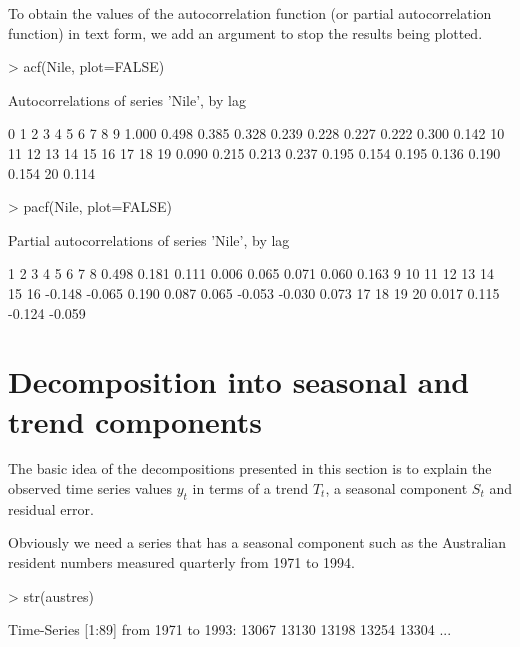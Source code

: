 To obtain the values of the autocorrelation function (or partial autocorrelation function) in text form, we add an argument to stop the results being plotted.
\begin{Schunk}
\begin{Sinput}
> acf(Nile, plot=FALSE)
\end{Sinput}
\begin{Soutput}

Autocorrelations of series 'Nile', by lag

    0     1     2     3     4     5     6     7     8     9 
1.000 0.498 0.385 0.328 0.239 0.228 0.227 0.222 0.300 0.142 
   10    11    12    13    14    15    16    17    18    19 
0.090 0.215 0.213 0.237 0.195 0.154 0.195 0.136 0.190 0.154 
   20 
0.114 
\end{Soutput}
\begin{Sinput}
> pacf(Nile, plot=FALSE)
\end{Sinput}
\begin{Soutput}

Partial autocorrelations of series 'Nile', by lag

     1      2      3      4      5      6      7      8 
 0.498  0.181  0.111  0.006  0.065  0.071  0.060  0.163 
     9     10     11     12     13     14     15     16 
-0.148 -0.065  0.190  0.087  0.065 -0.053 -0.030  0.073 
    17     18     19     20 
 0.017  0.115 -0.124 -0.059 
\end{Soutput}
\end{Schunk}

\section{Decomposition into seasonal and trend components}

The basic idea of the decompositions presented in this section is to explain the observed time series values $y_t$ in terms of a trend $T_t$, a seasonal component $S_t$ and residual error.

Obviously we need a series that has a seasonal component such as the Australian resident numbers measured quarterly from  1971 to 1994.
\begin{Schunk}
\begin{Sinput}
> str(austres)
\end{Sinput}
\begin{Soutput}
 Time-Series [1:89] from 1971 to 1993: 13067 13130 13198 13254 13304 ...
\end{Soutput}
\end{Schunk}


